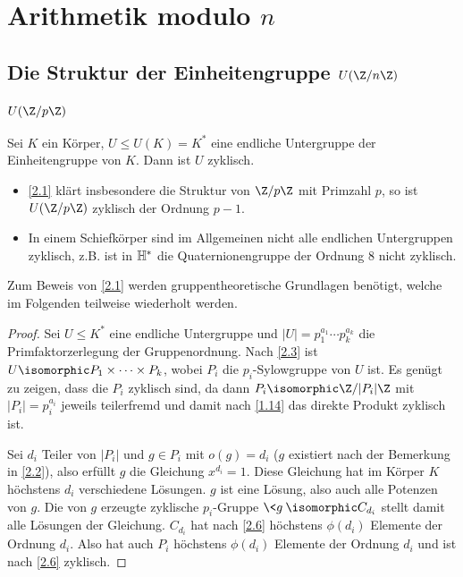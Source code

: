 \chapter{Arithmetik modulo \texorpdfstring{$n$}{n}}



\section{Die Struktur der Einheitengruppe \texorpdfstring{$U(\Z / n\Z)$}{U(ℤ/nℤ)}}


\subsection{\texorpdfstring{$U(\Z / p\Z)$}{U(ℤ/pℤ)}}


\begin{st} \label{2.1}
	Sei $K$ ein Körper, $U \le U(K) = K^*$ eine endliche Untergruppe der Einheitengruppe von $K$.
	Dann ist $U$ zyklisch.
	\begin{note}
		\begin{itemize}
			\item
				\ref{2.1} klärt insbesondere die Struktur von $\Z / p\Z$ mit Primzahl $p$, so ist $U(\Z / p\Z)$ zyklisch der Ordnung $p - 1$.
			\item
				In einem Schiefkörper sind im Allgemeinen nicht alle endlichen Untergruppen zyklisch, z.B. ist in $\mathbb{H}^*$ die Quaternionengruppe der Ordnung $8$ nicht zyklisch.
		\end{itemize}
		Zum Beweis von \ref{2.1} werden gruppentheoretische Grundlagen benötigt, welche im Folgenden teilweise wiederholt werden.
	\end{note}
	\begin{proof}
		Sei $U \le K^*$ eine endliche Untergruppe und $|U| = p_1^{a_1} \dotsb p_k^{a_k}$ die Primfaktorzerlegung der Gruppenordnung.
		Nach \ref{2.3} ist $U \isomorphic P_1 \times \dotsb \times P_k$, wobei $P_i$ die $p_i$-Sylowgruppe von $U$ ist.
		Es genügt zu zeigen, dass die $P_i$ zyklisch sind, da dann $P_i \isomorphic \Z / |P_i| \Z$ mit $|P_i| = p_i^{a_i}$ jeweils teilerfremd und damit nach \ref{1.14} das direkte Produkt zyklisch ist.

		Sei $d_i$ Teiler von $|P_i|$ und $g \in P_i$ mit $o(g) = d_i$ ($g$ existiert nach der Bemerkung in \ref{2.2}), also erfüllt $g$ die Gleichung $x^{d_i} = 1$.
		Diese Gleichung hat im Körper $K$ höchstens $d_i$ verschiedene Lösungen.
		$g$ ist eine Lösung, also auch alle Potenzen von $g$.
		Die von $g$ erzeugte zyklische $p_i$-Gruppe $\<g\> \isomorphic C_{d_i}$ stellt damit alle Lösungen der Gleichung.
		$C_{d_i}$ hat nach \ref{2.6} höchstens $\phi(d_i)$ Elemente der Ordnung $d_i$.
		Also hat auch $P_i$ höchstens $\phi(d_i)$ Elemente der Ordnung $d_i$ und ist nach \ref{2.6} zyklisch.
	\end{proof}
\end{st}

